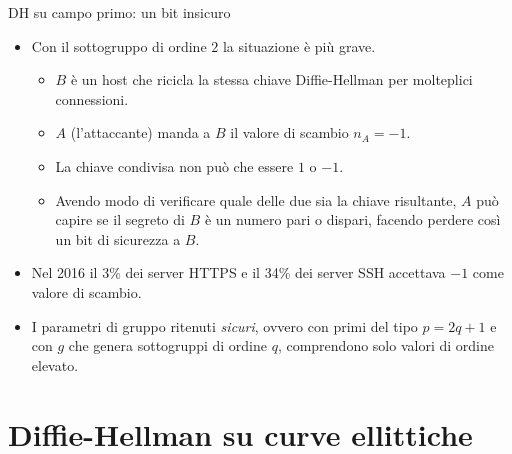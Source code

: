 \documentclass[11pt,svgnames,smaller,aspectratio=169,italian]{beamer}
\begin{document}
\begin{frame}{DH su campo primo: un bit insicuro}
	\begin{itemize}
		\item Con il sottogruppo di ordine $2$ la situazione è più grave.
			\begin{itemize}
				\item $B$ è un host che ricicla la stessa chiave Diffie-Hellman per molteplici connessioni.
				\item $A$ (l'attaccante) manda a $B$ il valore di scambio $n_{A} = -1$.
				\item La chiave condivisa non può che essere $1$ o $-1$.
				\item Avendo modo di verificare quale delle due sia la chiave risultante, $A$ può capire se il segreto di $B$ è un numero pari o dispari, facendo perdere così un bit di sicurezza a $B$.
			\end{itemize}
		\item Nel 2016 il 3\% dei server HTTPS e il 34\% dei server SSH accettava $-1$ come valore di scambio.
		\item I parametri di gruppo ritenuti \emph{sicuri}, ovvero con primi del tipo $p = 2q + 1$ e con $g$ che genera sottogruppi di ordine $q$, comprendono solo valori di ordine elevato.
	\end{itemize}
\end{frame}

\section{Diffie-Hellman su curve ellittiche}
\begin{frame}
	\sectionpage
	\centering
\end{frame}
\end{document}
